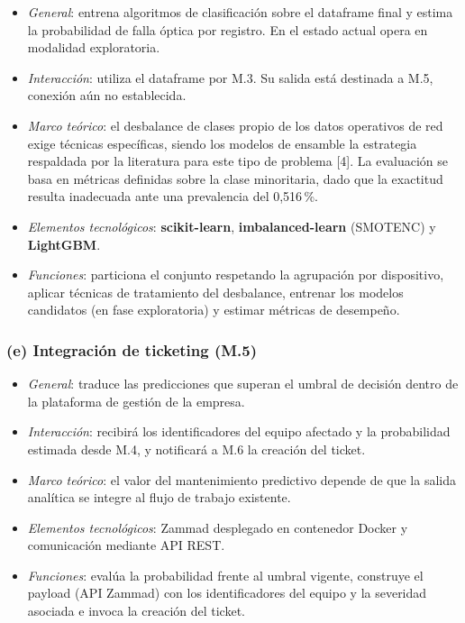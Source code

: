 \documentclass[12pt,a4paper]{article}
\begin{document}
\begin{itemize}
    \item \textit{General}: entrena algoritmos de clasificación sobre el dataframe final y estima la probabilidad de falla óptica por registro. En el estado actual opera en modalidad exploratoria.
    \item \textit{Interacción}: utiliza el dataframe por M.3. Su salida está destinada a M.5, conexión aún no establecida.
    \item \textit{Marco teórico}: el desbalance de clases propio de los datos operativos de red exige técnicas específicas, siendo los modelos de ensamble la estrategia respaldada por la literatura para este tipo de problema [4]. La evaluación se basa en métricas definidas sobre la clase minoritaria, dado que la exactitud resulta inadecuada ante una prevalencia del 0,516\,\%.
    \item \textit{Elementos tecnológicos}: \textbf{scikit-learn}, \textbf{imbalanced-learn} (SMOTENC) y \textbf{LightGBM}.
    \item \textit{Funciones}: particiona el conjunto respetando la agrupación por dispositivo, aplicar técnicas de tratamiento del desbalance, entrenar los modelos candidatos (en fase exploratoria) y estimar métricas de desempeño.
\end{itemize}

\subsubsection*{(e) Integración de ticketing (M.5)}
 
\begin{itemize}
    \item \textit{General}: traduce las predicciones que superan el umbral de decisión dentro de la plataforma de gestión de la empresa.
    \item \textit{Interacción}: recibirá los identificadores del equipo afectado y la probabilidad estimada desde M.4, y notificará a M.6 la creación del ticket.
    \item \textit{Marco teórico}: el valor del mantenimiento predictivo depende de que la salida analítica se integre al flujo de trabajo existente.
    \item \textit{Elementos tecnológicos}: Zammad desplegado en contenedor Docker y comunicación mediante API REST.
    \item \textit{Funciones}: evalúa la probabilidad frente al umbral vigente, construye el payload (API Zammad) con los identificadores del equipo y la severidad asociada e invoca la creación del ticket.
\end{itemize}
\end{document}
